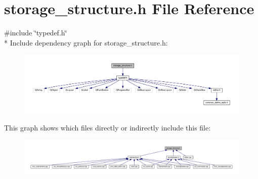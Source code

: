 \hypertarget{a00003}{\section{storage\+\_\+structure.\+h File Reference}
\label{a00003}
}
{\ttfamily \#include \char`\"{}typedef.\+h\char`\"{}}\\*
Include dependency graph for storage\+\_\+structure.\+h\+:
\nopagebreak
\begin{figure}[H]
\begin{center}
\leavevmode
\includegraphics[width=350pt]{dd/dc1/a00212}
\end{center}
\end{figure}
This graph shows which files directly or indirectly include this file\+:
\nopagebreak
\begin{figure}[H]
\begin{center}
\leavevmode
\includegraphics[width=350pt]{d1/de1/a00213}
\end{center}
\end{figure}
